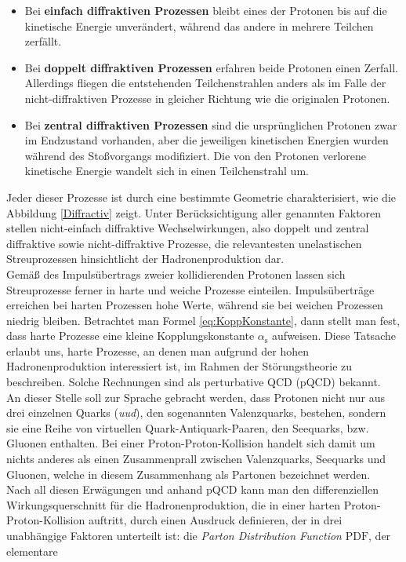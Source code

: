 \documentclass[12pt,a4paper]{report}
\begin{document}
\begin{itemize}
 \item Bei \textbf{einfach diffraktiven Prozessen} bleibt eines der Protonen bis auf die kinetische Energie unverändert, während das andere in mehrere Teilchen zerfällt.
 \item Bei \textbf{doppelt diffraktiven Prozessen} erfahren beide Protonen einen Zerfall. Allerdings fliegen die entstehenden Teilchenstrahlen anders als im Falle der nicht-diffraktiven Prozesse in gleicher Richtung wie die originalen Protonen.
 \item Bei \textbf{zentral diffraktiven Prozessen} sind die ursprünglichen Protonen zwar im Endzustand vorhanden, aber die jeweiligen kinetischen Energien wurden während des Stoßvorgangs modifiziert. Die von den Protonen verlorene kinetische Energie wandelt sich in einen Teilchenstrahl um.
\end{itemize}
Jeder dieser Prozesse ist durch eine bestimmte Geometrie charakterisiert, wie die Abbildung \ref{Diffractiv} zeigt. Unter Berücksichtigung aller genannten Faktoren stellen nicht-einfach diffraktive Wechselwirkungen, also doppelt und zentral diffraktive sowie nicht-diffraktive Prozesse, die relevantesten unelastischen Streuprozessen hinsichtlicht der Hadronenproduktion dar.\\
Gemäß des Impulsübertrags zweier kollidierenden Protonen lassen sich Streuprozesse ferner in harte und weiche Prozesse einteilen. Impulsüberträge erreichen bei harten Prozessen hohe Werte, während sie bei weichen Prozessen niedrig bleiben. Betrachtet man Formel \ref{eq:KoppKonstante}, dann stellt man fest, dass harte Prozesse eine kleine Kopplungskonstante $\alpha_\mathrm{s}$ aufweisen. Diese Tatsache erlaubt uns, harte Prozesse, an denen man aufgrund der hohen Hadronenproduktion interessiert ist, im Rahmen der Störungstheorie zu beschreiben. Solche Rechnungen sind als perturbative QCD (pQCD) bekannt.\\
An dieser Stelle soll zur Sprache gebracht werden, dass Protonen nicht nur aus drei einzelnen Quarks (\textit{uud}), den sogenannten Valenzquarks, bestehen, sondern sie eine Reihe von virtuellen Quark-Antiquark-Paaren, den Seequarks, bzw. Gluonen enthalten. Bei einer Proton-Proton-Kollision handelt sich damit um nichts anderes als einen Zusammenprall zwischen Valenzquarks, Seequarks und Gluonen, welche in diesem Zusammenhang als Partonen bezeichnet werden. \\
Nach all diesen Erwägungen und anhand pQCD kann man den differenziellen Wirkungsquerschnitt für die Hadronenproduktion, die in einer harten Proton-Proton-Kollision auftritt, durch einen Ausdruck definieren, der in drei unabhängige Faktoren unterteilt ist: die \textit{Parton Distribution Function} $\mathrm{PDF}$, der elementare
\end{document}
